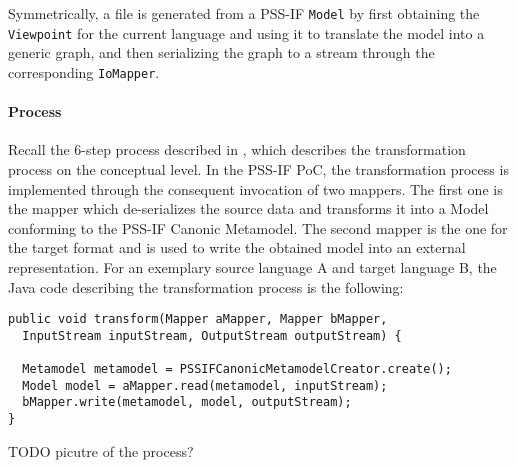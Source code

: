 Symmetrically, a file is generated from a PSS-IF \texttt{Model} by first obtaining the \texttt{Viewpoint} for the current language and using it to translate the model into a generic graph, and then serializing the graph to a stream through the corresponding \texttt{IoMapper}.

\paragraph{Process}

Recall the 6-step process described in , which describes the transformation process on the conceptual level. In the PSS-IF PoC, the transformation process is implemented through the consequent invocation of two mappers. The first one is the mapper which de-serializes the source data and transforms it into a Model conforming to the PSS-IF Canonic Metamodel. The second mapper is the one for the target format and is used to write the obtained model into an external representation. For an exemplary source language A and target language B, the Java code describing the transformation process is the following:

\begin{verbatim}
public void transform(Mapper aMapper, Mapper bMapper,
  InputStream inputStream, OutputStream outputStream) {
  
  Metamodel metamodel = PSSIFCanonicMetamodelCreator.create();
  Model model = aMapper.read(metamodel, inputStream);
  bMapper.write(metamodel, model, outputStream);
}
\end{verbatim}

\color{red}TODO picutre of the process?\color{black}



























